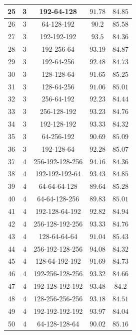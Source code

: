 \documentclass{article}
\begin{document}
\begin{longtable}{|c|c|c|c|c|}
        25 & 3 &  192-64-128 & $91.78$ & $84.85$ \\ \hline
        26 & 3 &  64-128-192 & $90.2$ & $85.58$ \\ \hline
        27 & 3 &  192-192-192 & $93.5$ & $84.36$ \\ \hline
        28 & 3 &  192-256-64 & $93.19$ & $84.87$ \\ \hline
        29 & 3 &  192-64-256 & $92.48$ & $84.73$ \\ \hline
        30 & 3 &  128-128-64 & $91.65$ & $85.25$ \\ \hline
        31 & 3 &  128-64-256 & $91.06$ & $85.01$ \\ \hline
        32 & 3 &  256-64-192 & $92.23$ & $84.44$ \\ \hline
        33 & 3 &  256-128-192 & $93.23$ & $84.76$ \\ \hline
        34 & 3 &  192-128-192 & $93.33$ & $84.32$ \\ \hline
        35 & 3 &  64-256-192 & $90.69$ & $85.09$ \\ \hline
        36 & 3 &  192-128-64 & $92.28$ & $85.07$ \\ \hline
        37 & 4 &  256-192-128-256 & $94.16$ & $84.36$ \\ \hline
        38 & 4 &  192-192-192-64 & $93.43$ & $84.85$ \\ \hline
        39 & 4 &  64-64-64-128 & $89.64$ & $85.28$ \\ \hline
        40 & 4 &  64-64-128-256 & $89.83$ & $85.01$ \\ \hline
        41 & 4 &  192-128-64-192 & $92.82$ & $84.94$ \\ \hline
        42 & 4 &  256-128-192-256 & $93.33$ & $84.76$ \\ \hline
        43 & 4 &  128-64-64-64 & $91.04$ & $85.43$ \\ \hline
        44 & 4 &  256-192-128-256 & $94.08$ & $84.32$ \\ \hline
        45 & 4 &  128-64-192-192 & $91.69$ & $84.73$ \\ \hline
        46 & 4 &  192-256-128-256 & $93.32$ & $84.66$ \\ \hline
        47 & 4 &  192-128-192-192 & $93.48$ & $84.2$ \\ \hline
        48 & 4 &  128-256-256-256 & $93.18$ & $84.51$ \\ \hline
        49 & 4 &  192-192-192-192 & $93.97$ & $84.04$ \\ \hline
        50 & 4 &  64-128-128-64 & $90.02$ & $85.16$ \\ \hline

\end{longtable}
\end{document}
